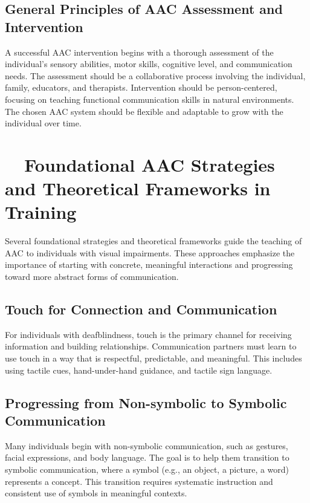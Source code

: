\subsection{General Principles of AAC Assessment and Intervention}\label{app6:aac-principles}
A successful AAC intervention begins with a thorough assessment of the individual's sensory abilities, motor skills, cognitive level, and communication needs. The assessment should be a collaborative process involving the individual, family, educators, and therapists. Intervention should be person-centered, focusing on teaching functional communication skills in natural environments. The chosen AAC system should be flexible and adaptable to grow with the individual over time.

\section{~~Foundational AAC Strategies and Theoretical Frameworks in Training}\label{app6:aac-frameworks}
Several foundational strategies and theoretical frameworks guide the teaching of AAC to individuals with visual impairments. These approaches emphasize the importance of starting with concrete, meaningful interactions and progressing toward more abstract forms of communication.

\subsection{Touch for Connection and Communication}\label{app6:touch-comm}
For individuals with deafblindness, touch is the primary channel for receiving information and building relationships. Communication partners must learn to use touch in a way that is respectful, predictable, and meaningful. This includes using \gls{tactile} cues, hand-under-hand guidance, and \gls{tactile} sign language.

\subsection{Progressing from Non-symbolic to Symbolic Communication}\label{app6:symbolic-comm}
Many individuals begin with non-symbolic communication, such as gestures, facial expressions, and body language. The goal is to help them transition to symbolic communication, where a symbol (e.g., an object, a picture, a word) represents a concept. This transition requires systematic instruction and consistent use of symbols in meaningful contexts.

